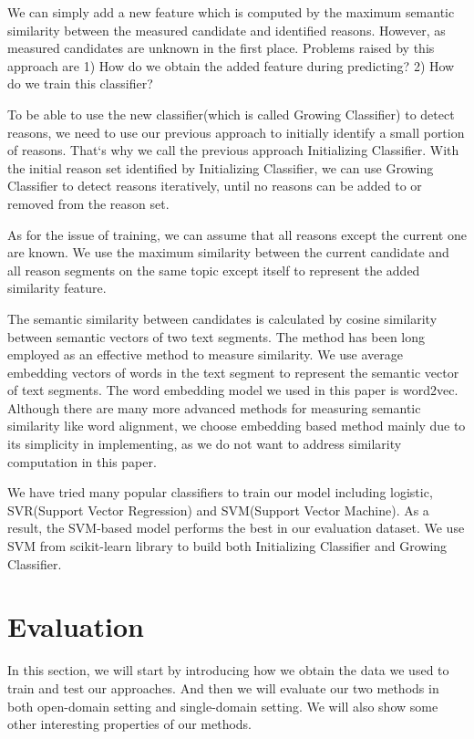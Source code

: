 \documentclass[11pt,a4paper]{article}
\begin{document}
We can simply add a new feature which is computed by the maximum semantic similarity between the measured candidate and identified reasons. However, as measured candidates are unknown in the first place. Problems raised by this approach are 1) How do we obtain the added feature during predicting? 2) How do we train this classifier?

To be able to use the new classifier(which is called Growing Classifier) to detect reasons, we need to use our previous approach to initially identify a small portion of reasons. That`s why we call the previous approach Initializing Classifier. With the initial reason set identified by Initializing Classifier, we can use Growing Classifier to detect reasons iteratively, until no reasons can be added to or removed from the reason set.

As for the issue of training, we can assume that all reasons except the current one are known. We use the maximum similarity between the current candidate and all reason segments on the same topic except itself to represent the added similarity feature.

The semantic similarity between candidates is calculated by cosine similarity between semantic vectors of two text segments. The method has been long employed as an effective method to measure similarity\cite{steinbach2000comparison}. We use average embedding vectors of words in the text segment to represent the semantic vector of text segments. The word embedding model we used in this paper is word2vec\cite{mikolov2013efficient}. Although there are many more advanced methods for measuring semantic similarity like word alignment\cite{sultan2015dls}, we choose embedding based method mainly due to its simplicity in implementing, as we do not want to address similarity computation in this paper.

We have tried many popular classifiers to train our model including logistic, SVR(Support Vector Regression) and SVM(Support Vector Machine). As a result, the SVM-based model performs the best in our evaluation dataset. We use SVM from scikit-learn library to build both Initializing Classifier and Growing Classifier.


\section{Evaluation}
\label{sec:evaluation}

In this section, we will start by introducing how we obtain the data we used to train and test our approaches. And then we will evaluate our two methods in both open-domain setting and single-domain setting. We will also show some other interesting properties of our methods. 
\end{document}
